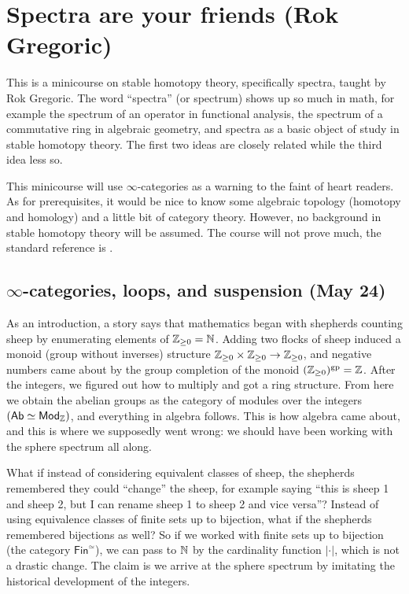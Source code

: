 \section{Spectra are your friends (Rok Gregoric)} 
This is a minicourse on stable homotopy theory, specifically spectra, taught by Rok Gregoric. The word ``spectra'' (or spectrum) shows up so much in math, for example the spectrum of an operator in functional analysis, the spectrum of a commutative ring in algebraic geometry, and spectra as a basic object of study in stable homotopy theory. The first two ideas are closely related while the third idea less so. 

This minicourse will use $\infty$-categories as a warning to the faint of heart readers. As for prerequisites, it would be nice to know some algebraic topology (homotopy and homology) and a little bit of category theory. However, no background in stable homotopy theory will be assumed. The course will not prove much, the standard reference is \cite{lurie}.

\subsection{$\infty$-categories, loops, and suspension (May 24)}
As an introduction, a story says that mathematics began with shepherds counting sheep by enumerating elements of $\mathbb{Z}_{\geq 0}=\mathbb{N}$. Adding two flocks of sheep induced a monoid (group without inverses) structure $\mathbb{Z}_{\geq 0}\times \mathbb{Z}_{\geq 0}\to  \mathbb{Z}_{\geq 0}$, and negative numbers came about by the group completion of the monoid $(\mathbb{Z}_{\geq 0})^{\mathrm{gp}}=\mathbb{Z}$. 
After the integers, we figured out how to multiply and got a ring structure. From here we obtain the abelian groups as the category of modules over the integers $(\mathsf{Ab} \simeq \mathsf{Mod} _{\mathbb{Z}})$, and everything in algebra follows. This is how algebra came about, and this is where we supposedly went wrong: we should have been working with the sphere spectrum all along.

What if instead of considering equivalent classes of sheep, the shepherds remembered they could ``change'' the sheep, for example saying ``this is sheep 1 and sheep 2, but I can rename sheep 1 to sheep 2 and vice versa''? Instead of using equivalence classes of finite sets up to bijection, what if the shepherds remembered bijections as well? So if we worked with finite sets up to bijection (the category $\mathsf{Fin} ^{\simeq}$), we can pass to $\mathbb{N}$ by the cardinality function $|\cdot |$, which is not a drastic change. The claim is we arrive at the sphere spectrum by imitating the historical development of the integers.

